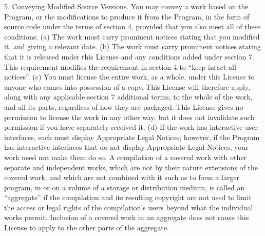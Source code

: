 \documentclass {scrbook}
\begin{document}
\begin{tiny}
5. Conveying Modified Source Versions. You may convey a work based on the Program, or the modifications to produce it from the Program, in the form of source code under the terms of section 4, provided that you also meet all of these conditions: (a) The work must carry prominent notices stating that you modified it, and giving a relevant date. (b) The work must carry prominent notices stating that it is released under this License and any conditions added under section 7. This requirement modifies the requirement in section 4 to ``keep intact all notices''. (c) You must license the entire work, as a whole, under this License to anyone who comes into possession of a copy. This License will therefore apply, along with any applicable section 7 additional terms, to the whole of the work, and all its parts, regardless of how they are packaged. This License gives no permission to license the work in any other way, but it does not invalidate such permission if you have separately received it. (d) If the work has interactive user interfaces, each must display Appropriate Legal Notices; however, if the Program has interactive interfaces that do not display Appropriate Legal Notices, your work need not make them do so. A compilation of a covered work with other separate and independent works, which are not by their nature extensions of the covered work, and which are not combined with it such as to form a larger program, in or on a volume of a storage or distribution medium, is called an ``aggregate'' if the compilation and its resulting copyright are not used to limit the access or legal rights of the compilation's users beyond what the individual works permit. Inclusion of a covered work in an aggregate does not cause this License to apply to the other parts of the aggregate.


\end{tiny}
\end{document}
